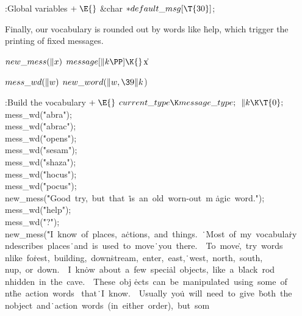 \B{}:Global variables\X${}\mathrel+\E{}$\6
\&{char} ${}{*}\\{default\_msg}[\T{30}]{}$;\par
\fi

Finally, our vocabulary is rounded out by words like %
\.{help}, which
trigger the printing of fixed messages.

\Y\B\4\D$\\{new\_mess}(\|x)$ \5
$\\{message}[\|k\PP]\K{}$\|x\par
\B\4\D$\\{mess\_wd}(\|w)$ \5
$\\{new\_word}(\|w,\39\|k{}$)\par
\Y\B\4:Build the vocabulary\X${}\mathrel+\E{}$\6
$\\{current\_type}\K\\{message\_type};{}$\6
${}\|k\K\T{0};{}$\6
\\{mess\_wd}(\.{"abra"});\5
\\{mess\_wd}(\.{"abrac"});\6
\\{mess\_wd}(\.{"opens"});\5
\\{mess\_wd}(\.{"sesam"});\5
\\{mess\_wd}(\.{"shaza"});\6
\\{mess\_wd}(\.{"hocus"});\5
\\{mess\_wd}(\.{"pocus"});\6
\\{new\_mess}(\.{"Good\ try,\ but\ that\ }\)\.{is\ an\ old\ worn-out\ m}\)%
\.{agic\ word."});\6
\\{mess\_wd}(\.{"help"});\5
\\{mess\_wd}(\.{"?"});\6
\\{new\_mess}(\.{"I\ know\ of\ places,\ a}\)\.{ctions,\ and\ things.\ }\)\.{\
Most\ of\ my\ vocabula}\)\.{ry\\ndescribes\ places}\)\.{\ and\ is\ used\ to\
move}\)\.{\ you\ there.\ \ To\ move}\)\.{,\ try\ words\\nlike\ fo}\)\.{rest,\
building,\ down}\)\.{stream,\ enter,\ east,}\)\.{\ west,\ north,\ south,}\)\.{%
\\nup,\ or\ down.\ \ I\ kn}\)\.{ow\ about\ a\ few\ speci}\)\.{al\ objects,\
like\ a\ b}\)\.{lack\ rod\\nhidden\ in\ }\)\.{the\ cave.\ \ These\ obj}\)%
\.{ects\ can\ be\ manipula}\)\.{ted\ using\ some\ of\\nt}\)\.{he\ action\ words%
\ that}\)\.{\ I\ know.\ \ Usually\ yo}\)\.{u\ will\ need\ to\ give\ }\)\.{both\
the\\nobject\ and}\)\.{\ action\ words\ (in\ ei}\)\.{ther\ order),\ but\ som}\)%
